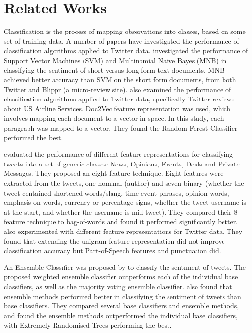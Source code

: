 \section{Related Works}

Classification is the process of mapping observations into classes, based on some set of training data. A number of papers have investigated the performance of classification algorithms applied to Twitter data. \cite{Berm2010} investigated the performance of Support Vector Machines (SVM) and Multinomial Naïve Bayes (MNB) in classifying the sentiment of short versus long form text documents. MNB achieved better accuracy than SVM on the short form documents, from both Twitter and Blippr (a micro-review site). \cite{Rane2018} also examined the performance of classification algorithms applied to Twitter data, specifically Twitter reviews about US Airline Services. Doc2Vec feature representation was used, which involves mapping each document to a vector in space. In this study, each paragraph was mapped to a vector. They found the Random Forest Classifier performed the best.

\cite{sriram2010} evaluated the performance of different feature representations for classifying tweets into a set of generic classes: News, Opinions, Events, Deals and Private Messages. They proposed an eight-feature technique. Eight features were extracted from the tweets, one nominal (author) and seven binary (whether the tweet contained shortened words/slang, time-event phrases, opinion words, emphasis on words, currency or percentage signs, whether the tweet username is at the start, and whether the username is mid-tweet). They compared their 8-feature technique to bag-of-words and found it performed significantly better. \cite{Berm2010} also experimented with different feature representations for Twitter data. They found that extending the unigram feature representation did not improve classification accuracy but Part-of-Speech features and punctuation did. 

An Ensemble Classifier was proposed by \cite{Ankit2018} to classify the sentiment of tweets. The proposed weighted ensemble classifier outperforms each of the individual base classifiers, as well as the majority voting ensemble classifier. \cite{Kanakaraj2015} also found that ensemble methods performed better in classifying the sentiment of tweets than base classifiers. They compared several base classifiers and ensemble methods, and found the ensemble methods outperformed the individual base classifiers, with Extremely Randomised Trees performing the best.

